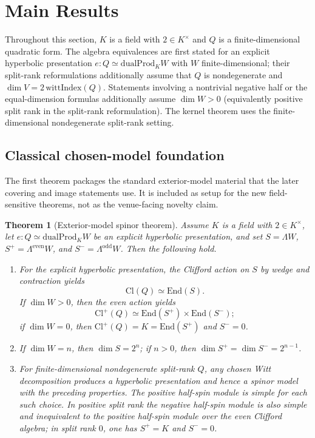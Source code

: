 \documentclass{birkjour}
\theoremstyle{plain}
\newtheorem{theorem}{Theorem}[section]
\theoremstyle{definition}
\theoremstyle{remark}
\newcommand{\Cl}{\mathrm{Cl}}
\newcommand{\End}{\mathrm{End}}
\newcommand{\dualProd}{\mathrm{dualProd}}
\newcommand{\wedgeW}{\Lambda W}
\newcommand{\wedgeEven}{\Lambda^{\mathrm{even}} W}
\newcommand{\wedgeOdd}{\Lambda^{\mathrm{odd}} W}
\begin{document}
\section{Main Results}
\label{sec:results}

Throughout this section, $K$ is a field with $2\in K^\times$ and $Q$ is a
finite-dimensional quadratic form. The algebra equivalences are first stated
for an explicit hyperbolic presentation $e:Q \simeq \dualProd_K W$ with
$W$ finite-dimensional; their split-rank reformulations additionally assume
that $Q$ is nondegenerate and $\dim V = 2\,\mathrm{wittIndex}(Q)$. Statements
involving a nontrivial negative half or the equal-dimension formulas
additionally assume $\dim W>0$ (equivalently positive split rank in the
split-rank reformulation). The kernel theorem uses the finite-dimensional
nondegenerate split-rank setting.

\subsection*{Classical chosen-model foundation}

The first theorem packages the standard exterior-model material that the later
covering and image statements use. It is included as setup for the new
field-sensitive theorems, not as the venue-facing novelty claim.

\begin{theorem}[Exterior-model spinor theorem]
\label{thm:chosen-spinor-package}
Assume $K$ is a field with $2\in K^\times$, let
$e:Q \simeq \dualProd_K W$ be an explicit hyperbolic presentation, and set
$S=\wedgeW$, $S^+=\wedgeEven$, and $S^-=\wedgeOdd$. Then the following hold.
\begin{enumerate}
\item For the explicit hyperbolic presentation, the Clifford action on $S$ by
  wedge and contraction yields
  \[
    \Cl(Q)\simeq \End(S).
  \]
  If $\dim W>0$, then the even action yields
  \[
    \Cl^+(Q)\simeq \End(S^+) \times \End(S^-);
  \]
  if $\dim W=0$, then $\Cl^+(Q)=K=\End(S^+)$ and $S^-=0$.
\item If $\dim W=n$, then $\dim S = 2^n$; if $n>0$, then
  $\dim S^+ = \dim S^- = 2^{n-1}$.
\item For finite-dimensional nondegenerate split-rank $Q$, any chosen Witt
  decomposition produces a hyperbolic presentation and hence a spinor model
  with the preceding properties. The positive half-spin module is simple for
  each such choice. In positive split rank the negative half-spin module is also
  simple and inequivalent to the positive half-spin module over the even
  Clifford algebra; in split rank $0$, one has $S^+=K$ and $S^-=0$.
\end{enumerate}
\end{theorem}
\end{document}
